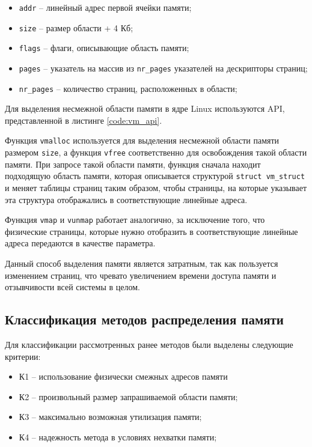 \begin{itemize}
	\item \texttt{addr} -- линейный адрес первой ячейки памяти;
	\item \texttt{size} -- размер области + 4 Кб;
	\item \texttt{flags} -- флаги, описывающие область памяти;
	\item \texttt{pages} -- указатель на массив из \texttt{nr\_pages} указателей на дескрипторы страниц;
	\item \texttt{nr\_pages} -- количество страниц, расположенных в области;
\end{itemize}

Для выделения несмежной области памяти в ядре Linux используются API, представленной в листинге \ref{code:vm_api}.


Функция \texttt{vmalloc} используется для выделения несмежной области памяти размером \texttt{size}, а функция \texttt{vfree} соответственно для освобождения такой области памяти. При запросе такой области памяти, функция сначала находит подходящую область памяти, которая описывается структурой \texttt{struct vm\_struct} и меняет таблицы страниц таким образом, чтобы страницы, на которые указывает эта структура отображались в соответствующие линейные адреса. 

Функция \texttt{vmap} и \texttt{vunmap} работает аналогично, за исключение того, что физические страницы, которые нужно отобразить в соответствующие линейные адреса передаются в качестве параметра.

Данный способ выделения памяти является затратным, так как пользуется изменением страниц, что чревато увеличением времени доступа памяти и отзывчивости всей системы в целом.

\subsection{Классификация методов распределения памяти}

Для классификации рассмотренных ранее методов были выделены следующие критерии:

\begin{itemize}
	\item К1 -- использование физически смежных адресов памяти
	\item К2 -- произвольный размер запрашиваемой области памяти;
	\item К3 -- максимально возможная утилизация памяти;
	\item К4 -- надежность метода в условиях нехватки памяти;
\end{itemize}

